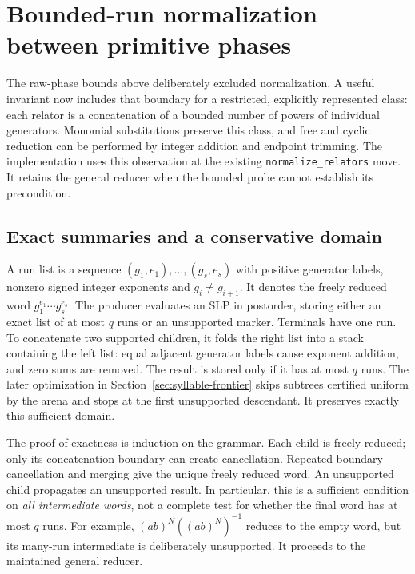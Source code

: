 \section{Bounded-run normalization between primitive phases}
\label{sec:syllable-normalization}

The raw-phase bounds above deliberately excluded normalization. A useful
invariant now includes that boundary for a restricted, explicitly represented
class: each relator is a concatenation of a bounded number of powers of
individual generators. Monomial substitutions preserve this class, and
free and cyclic reduction can be performed by integer addition and endpoint
trimming. The implementation uses this observation at the existing
\texttt{normalize\_relators} move. It retains the general reducer when the
bounded probe cannot establish its precondition.

\subsection{Exact summaries and a conservative domain}

A run list is a sequence $(g_1,e_1),\ldots,(g_s,e_s)$ with positive generator
labels, nonzero signed integer exponents and $g_i\ne g_{i+1}$. It denotes the
freely reduced word $g_1^{e_1}\cdots g_s^{e_s}$. The producer evaluates an
SLP in postorder, storing either an exact list of at most $q$ runs or an
unsupported marker. Terminals have one run. To concatenate two supported
children, it folds the right list into a stack containing the left list:
equal adjacent generator labels cause exponent addition, and zero sums
are removed. The result is stored only if it has at most $q$ runs.
The later optimization in Section~\ref{sec:syllable-frontier} skips
subtrees certified uniform by the arena and stops at the first unsupported
descendant. It preserves exactly this sufficient domain.

The proof of exactness is induction on the grammar. Each child is freely
reduced; only its concatenation boundary can create cancellation. Repeated
boundary cancellation and merging give the unique freely reduced word.
An unsupported child propagates an unsupported result. In particular, this
is a sufficient condition on \emph{all intermediate words}, not a complete
test for whether the final word has at most $q$ runs. For example,
$(ab)^N((ab)^N)^{-1}$ reduces to the empty word, but its many-run intermediate
is deliberately unsupported. It proceeds to the maintained general reducer.

